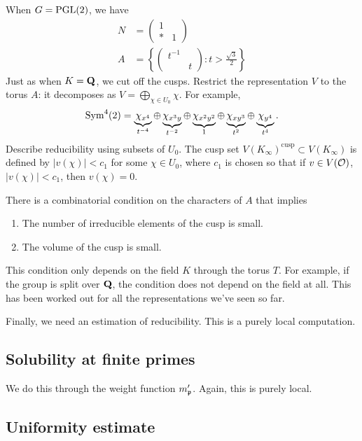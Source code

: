 When $G=\operatorname{PGL}(2)$, we have 
\begin{align*}
  N &= \begin{pmatrix} 1 \\ \ast & 1 \end{pmatrix} \\
  A &= \left\{\begin{pmatrix} t^{-1} \\ & t\end{pmatrix}:t>\frac{\sqrt 3}{2}\right\} 
\end{align*}
Just as when $K=\mathbf{Q}$, we cut off the cusps. Restrict the representation $V$ to 
the torus $A$: it decomposes as $V=\bigoplus_{\chi\in U_0} \chi$. For 
example, 
\[
  \operatorname{Sym}^4(2) = \underbrace{\chi_{x^4}}_{t^{-4}} \oplus \underbrace{\chi_{x^3 y}}_{t^{-2}}\oplus \underbrace{\chi_{x^2 y^2}}_1 \oplus \underbrace{\chi_{x y^3}}_{t^2}\oplus \underbrace{\chi_{y^4}}_{t^4} .
\]
Describe reducibility using subsets of $U_0$. The cusp set  
$V(K_\infty)^\mathrm{cusp}\subset V(K_\infty)$ is defined by 
$|v(\chi)|<c_1$ for some $\chi\in U_0$, where $c_1$ is chosen so that if 
$v\in V(\mathcal{O})$, $|v(\chi)|<c_1$, then $v(\chi)=0$. 

There is a combinatorial condition on the characters of $A$ that implies 
\begin{enumerate}
  \item The number of irreducible elements of the cusp is small. 
  \item The volume of the cusp is small. 
\end{enumerate}
This condition only depends on the field $K$ through the torus $T$. For 
example, if the group is split over $\mathbf{Q}$, the condition does not depend on the 
field at all. This has been worked out for all the representations we've seen 
so far. 

Finally, we need an estimation of reducibility. This is a purely local 
computation. 





\subsection{Solubility at finite primes}

We do this through the weight function $m_{\mathfrak{p}}'$. Again, this is purely 
local. 





\subsection{Uniformity estimate}

